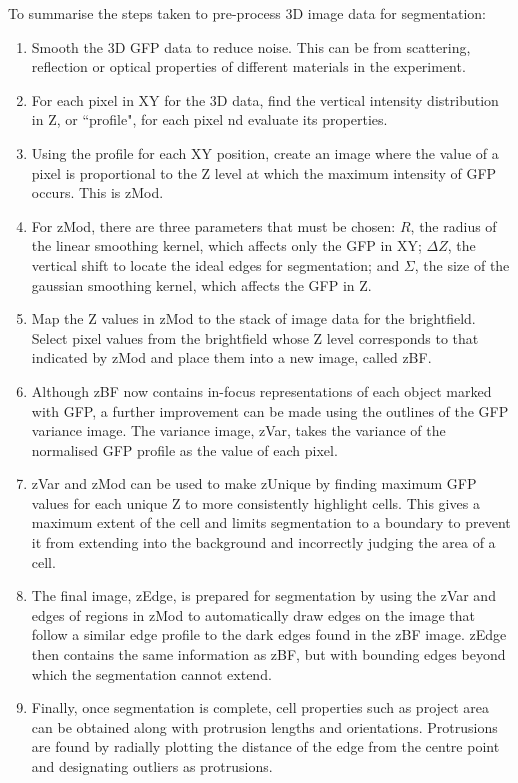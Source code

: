 To summarise the steps taken to pre-process 3D image data for segmentation:
\begin{enumerate}
\item Smooth the 3D GFP data to reduce noise. This can be from scattering, reflection or optical properties of different materials in the experiment.
\item For each pixel in XY for the 3D data, find the vertical intensity distribution in Z, or ``profile", for each pixel nd evaluate its properties.
\item Using the profile for each XY position, create an image where the value of a pixel is proportional to the Z level at which the maximum intensity of GFP occurs. This is zMod.
\item For zMod, there are three parameters that must be chosen: $R$, the radius of the linear smoothing kernel, which affects only the GFP in XY; $\Delta Z$, the vertical shift to locate the ideal edges for segmentation; and $\Sigma$, the size of the gaussian smoothing kernel, which affects the GFP in Z.
\item Map the Z values in zMod to the stack of image data for the brightfield. Select pixel values from the brightfield whose Z level corresponds to that indicated by zMod and place them into a new image, called zBF.
\item Although zBF now contains in-focus representations of each object marked with GFP, a further improvement can be made using the outlines of the GFP variance image. The variance image, zVar, takes the variance of the normalised GFP profile as the value of each pixel.
\item zVar and zMod can be used to make zUnique by finding maximum GFP values for each unique Z to more consistently highlight cells. This gives a maximum extent of the cell and limits segmentation to a boundary to prevent it from extending into the background and incorrectly judging the area of a cell.
\item The final image, zEdge, is prepared for segmentation by using the zVar and edges of regions in zMod to automatically draw edges on the image that follow a similar edge profile to the dark edges found in the zBF image. zEdge then contains the same information as zBF, but with bounding edges beyond which the segmentation cannot extend.
\item Finally, once segmentation is complete, cell properties such as project area can be obtained along with protrusion lengths and orientations. Protrusions are found by radially plotting the distance of the edge from the centre point and designating outliers as protrusions.
\end{enumerate}

